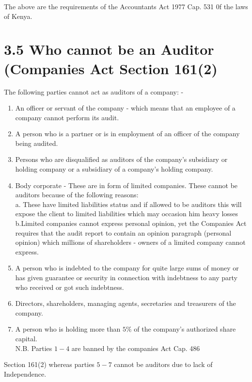 \documentclass[10pt]{article}
\begin{document}
The above are the requirements of the Accountants Act 1977 Cap. 531 0f the laws of Kenya.\\
\section*{3.5 Who cannot be an Auditor (Companies Act Section 161(2)}

The following parties cannot act as auditors of a company: -

\begin{enumerate}
  \item An officer or servant of the company - which means that an employee of a company cannot perform its audit.
  \item A person who is a partner or is in employment of an officer of the company being audited.
  \item Persons who are disqualified as auditors of the company's subsidiary or holding company or a subsidiary of a company's holding company.
  \item Body corporate - These are in form of limited companies. These cannot be auditors because of the following reasons:\\
a. These have limited liabilities status and if allowed to be auditors this will expose the client to limited liabilities which may occasion him heavy losses\\
b.Limited companies cannot express personal opinion, yet the Companies Act requires that the audit report to contain an opinion paragraph (personal opinion) which millions of shareholders - owners of a limited company cannot express.
  \item A person who is indebted to the company for quite large sums of money or has given guarantee or security in connection with indebtness to any party who received or got such indebtness.
  \item Directors, shareholders, managing agents, secretaries and treasurers of the company.
  \item A person who is holding more than $5 \%$ of the company's authorized share capital.\\
N.B. Parties $1-4$ are banned by the companies Act Cap. 486
\end{enumerate}

Section 161(2) whereas parties $5-7$ cannot be auditors due to lack of Independence.
\end{document}
